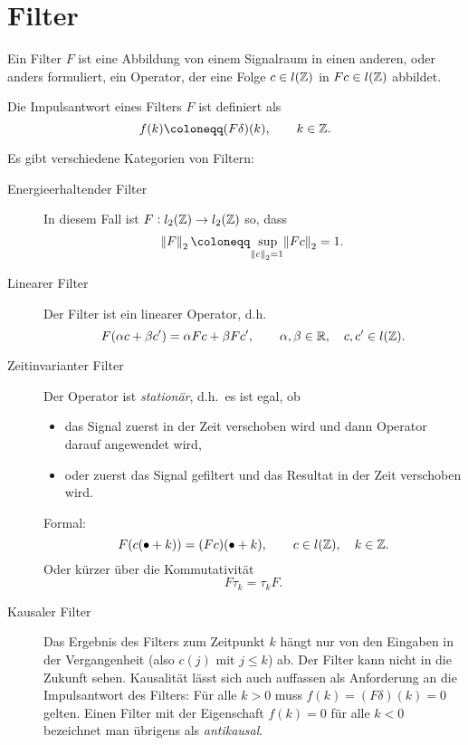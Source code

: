 \section{Filter}

\begin{definition}[Filter]
Ein Filter $ F $ ist eine Abbildung von einem Signalraum in einen anderen, oder anders formuliert, 
ein Operator, der eine Folge $ c \in l(\mathbb{Z}) $ in $ Fc \in l(\mathbb{Z}) $ abbildet.
\end{definition}

\begin{definition}[Impulsantwort]
Die Impulsantwort eines Filters $ F $ ist definiert als
\[
  f(k) \coloneqq (F \delta)(k), \qquad k \in \Z.
\]
\end{definition}

\begin{remark}[Filtertypen]
Es gibt verschiedene Kategorien von Filtern:
\begin{description}
\item [Energieerhaltender Filter]
  In diesem Fall ist $ F : l_{2}(\mathbb{Z}) \rightarrow l_{2}(\mathbb{Z}) $ so, dass
  \[
    \norm{F}_{2} \coloneqq \sup_{\norm{c}_{2} = 1} \norm{Fc}_{2} = 1.
  \]
\item [Linearer Filter]
  Der Filter ist ein linearer Operator, d.h.\
  \[
    F(\alpha c + \beta c') = \alpha Fc + \beta Fc', \qquad \alpha, \beta \in \mathbb{R}, 
                                                    \quad c, c' \in l(\mathbb{Z}).
  \]
\item [Zeitinvarianter Filter]
  Der Operator ist \emph{stationär}, d.h.\ es ist egal, ob
  \begin{itemize}
  \item das Signal zuerst in der Zeit verschoben wird und dann Operator darauf angewendet wird,
  \item oder zuerst das Signal gefiltert und das Resultat in der Zeit verschoben wird.
  \end{itemize}
  Formal:
  \[
    F(c(\bullet + k)) = (Fc)(\bullet + k), \qquad c \in l(\mathbb{Z}), \quad k \in \mathbb{Z}.
  \]
  Oder kürzer über die Kommutativität
  \[
    F\tau_{k} = \tau_{k}F.
  \]
\item [Kausaler Filter]
  Das Ergebnis des Filters zum Zeitpunkt $ k $ hängt nur von den Eingaben in der Vergangenheit
  (also $ c(j) $ mit $ j \leq k $) ab. Der Filter kann nicht in die Zukunft sehen. Kausalität
  lässt sich auch auffassen als Anforderung an die Impulsantwort des Filters: Für alle $ k > 0 $
  muss $ f(k) = (F\delta)(k) = 0 $ gelten. Einen Filter mit der Eigenschaft $ f(k) = 0 $ für alle
  $ k < 0 $ bezeichnet man übrigens als \emph{antikausal}.
\end{description}
\end{remark}


